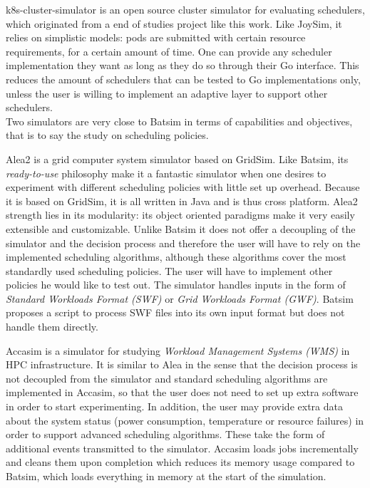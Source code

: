 k8s-cluster-simulator\cite{k8s-cluster-simulator} is an open source cluster
simulator for evaluating schedulers, which originated from a end of studies
project like this work. Like JoySim, it relies on simplistic models: pods are
submitted with certain resource requirements, for a certain amount of time. One
can provide any scheduler implementation they want as long as they do so
through their Go interface. This reduces the amount of schedulers that can be
tested to Go implementations only, unless the user is willing to
implement an adaptive layer to support other schedulers.\\

Two simulators are very close to Batsim in terms of capabilities and
objectives, that is to say the study on scheduling policies.

Alea2\cite{alea2} is a grid computer system simulator based on GridSim. Like
Batsim, its \textit{ready-to-use} philosophy make it a fantastic simulator when
one desires to experiment with different scheduling policies with little set up
overhead. Because it is based on GridSim, it is all written in Java and is thus
cross platform. Alea2 strength lies in its modularity: its object oriented
paradigms make it very easily extensible and customizable. Unlike Batsim it
does not offer a decoupling of the simulator and the decision process and
therefore the user will have to rely on the implemented scheduling algorithms,
although these algorithms cover the most standardly used scheduling policies.
The user will have to implement other policies he would like to test out. The
simulator handles inputs in the form of \textit{Standard Workloads Format
(SWF)} or \textit{Grid Workloads Format (GWF)}. Batsim proposes a script to
process SWF files into its own input format but does not handle them directly.

Accasim\cite{10.1007/978-3-319-73353-1_12} is a simulator for studying
\textit{Workload Management Systems (WMS)} in HPC infrastructure. It is similar
to Alea in the sense that the decision process is not decoupled from the
simulator and standard scheduling algorithms are implemented in Accasim, so
that the user does not need to set up extra software in order to start
experimenting. In addition, the user may provide extra data about the system
status (power consumption, temperature or resource failures) in order to
support advanced scheduling algorithms.  These take the form of additional
events transmitted to the simulator. Accasim loads jobs incrementally and
cleans them upon completion which reduces its memory usage compared to Batsim,
which loads everything in memory at the start of the simulation.

